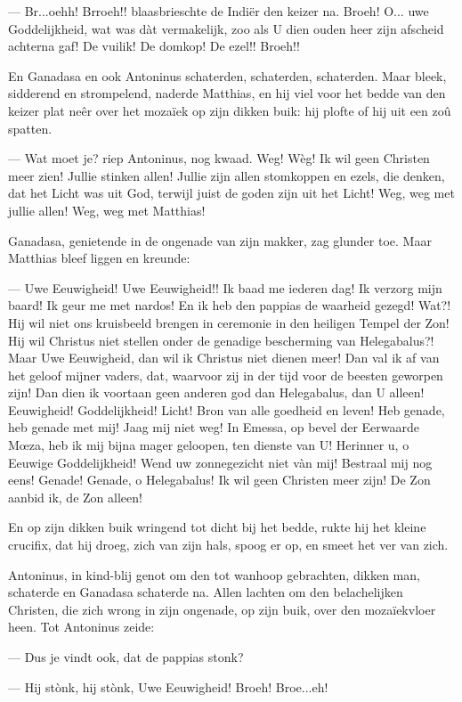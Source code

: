 \documentclass[a4paper, 12pt, oneside, dutch]{article}
\begin{document}
--- Br...oehh! Brroeh!! blaasbrieschte de Indiër den keizer na. Broeh! O... uwe Goddelijkheid, wat was dàt vermakelijk, zoo als U dien ouden heer zijn afscheid achterna gaf! De vuilik! De domkop! De ezel!! Broeh!!

En Ganadasa en ook Antoninus schaterden, schaterden, schaterden. Maar bleek, sidderend en strompelend, naderde Matthias, en hij viel voor het bedde van den keizer plat neêr over het mozaïek op zijn dikken buik: hij plofte of hij uit een zoû spatten.

--- Wat moet je? riep Antoninus, nog kwaad. Weg! Wèg! Ik wil geen Christen meer zien! Jullie stinken allen! Jullie zijn allen stomkoppen en ezels, die denken, dat het Licht was uit God, terwijl juist de goden zijn uit het Licht! Weg, weg met jullie allen! Weg, weg met Matthias!

Ganadasa, genietende in de ongenade van zijn makker, zag glunder toe. Maar Matthias bleef liggen en kreunde:

--- Uwe Eeuwigheid! Uwe Eeuwigheid!! Ik baad me iederen dag! Ik verzorg mijn baard! Ik geur me met nardos! En ik heb den pappias de waarheid gezegd! Wat?! Hij wil niet ons kruisbeeld brengen in ceremonie in den heiligen Tempel der Zon! Hij wil Christus niet stellen onder de genadige bescherming van Helegabalus?! Maar Uwe Eeuwigheid, dan wil ik Christus niet dienen meer! Dan val ik af van het geloof mijner vaders, dat, waarvoor zij in der tijd voor de beesten geworpen zijn! Dan dien ik voortaan geen anderen god dan Helegabalus, dan U alleen! Eeuwigheid! Goddelijkheid! Licht! Bron van alle goedheid en leven! Heb genade, heb genade met mij! Jaag mij niet weg! In Emessa, op bevel der Eerwaarde Mœza, heb ik mij bijna mager geloopen, ten dienste van U! Herinner u, o Eeuwige Goddelijkheid! Wend uw zonnegezicht niet vàn mij! Bestraal mij nog eens! Genade! Genade, o Helegabalus! Ik wil geen Christen meer zijn! De Zon aanbid ik, de Zon alleen!

En op zijn dikken buik wringend tot dicht bij het bedde, rukte hij het kleine crucifix, dat hij droeg, zich van zijn hals, spoog er op, en smeet het ver van zich.

Antoninus, in kind-blij genot om den tot wanhoop gebrachten, dikken man, schaterde en Ganadasa schaterde na. Allen lachten om den belachelijken Christen, die zich wrong in zijn ongenade, op zijn buik, over den mozaïekvloer heen. Tot Antoninus zeide:

--- Dus je vindt ook, dat de pappias stonk?

--- Hij stònk, hij stònk, Uwe Eeuwigheid! Broeh! Broe...eh!
\end{document}
